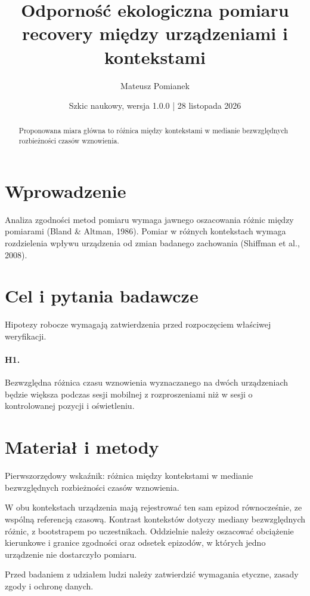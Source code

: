 \documentclass[11pt,a4paper]{article}
\title{Odporność ekologiczna pomiaru recovery między urządzeniami i kontekstami}
\author{Mateusz Pomianek}
\date{Szkic naukowy, wersja 1.0.0 | 28 listopada 2026}
\begin{document}
\maketitle

\begin{abstract}

Proponowana miara główna to różnica między kontekstami w medianie bezwzględnych rozbieżności czasów wznowienia.

\end{abstract}

\section{Wprowadzenie}

Analiza zgodności metod pomiaru wymaga jawnego oszacowania różnic między pomiarami (Bland \& Altman, 1986). Pomiar w różnych kontekstach wymaga rozdzielenia wpływu urządzenia od zmian badanego zachowania (Shiffman et al., 2008).

\section{Cel i pytania badawcze}

Hipotezy robocze wymagają zatwierdzenia przed rozpoczęciem właściwej weryfikacji.

\paragraph{H1.} Bezwzględna różnica czasu wznowienia wyznaczanego na dwóch urządzeniach będzie większa podczas sesji mobilnej z rozproszeniami niż w sesji o kontrolowanej pozycji i oświetleniu.

\section{Materiał i metody}

Pierwszorzędowy wskaźnik: różnica między kontekstami w medianie bezwzględnych rozbieżności czasów wznowienia.

W obu kontekstach urządzenia mają rejestrować ten sam epizod równocześnie, ze wspólną referencją czasową. Kontrast kontekstów dotyczy mediany bezwzględnych różnic, z bootstrapem po uczestnikach. Oddzielnie należy oszacować obciążenie kierunkowe i granice zgodności oraz odsetek epizodów, w których jedno urządzenie nie dostarczyło pomiaru.

Przed badaniem z udziałem ludzi należy zatwierdzić wymagania etyczne, zasady zgody i ochronę danych.
\end{document}
